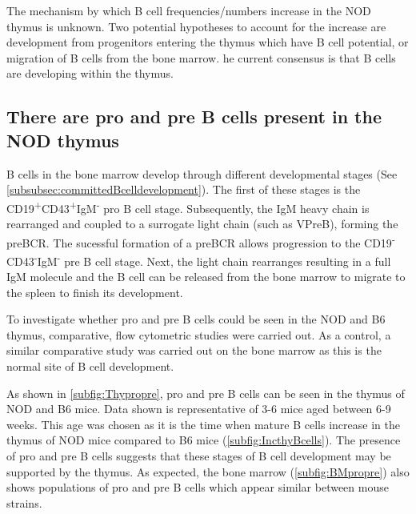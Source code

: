 The mechanism by which B cell frequencies/numbers increase in the NOD thymus is unknown. 
Two potential hypotheses to account for the increase are development from progenitors entering the thymus which have B cell potential, or migration of B cells from the bone marrow. \toref{}
he current consensus is that B cells are developing within the thymus. 


\subsection{There are pro and pre B cells present in the NOD thymus}
\label{subsec:proandpre}


B cells in the bone marrow develop through different developmental stages (See \cref{subsubsec:committedBcelldevelopment}).
The first of these stages is the CD19\textsuperscript{+}CD43\textsuperscript{+}IgM\textsuperscript{-} pro B cell stage.
Subsequently, the IgM heavy chain is rearranged and coupled to a surrogate light chain (such as VPreB), forming the preBCR. 
The sucessful formation of a preBCR allows progression to the CD19\textsuperscript{-}CD43\textsuperscript{-}IgM\textsuperscript{-} pre B cell stage.
Next, the light chain rearranges resulting in a full IgM molecule and the B cell can be released from the bone marrow to migrate to the spleen to finish its development.



To investigate whether pro and pre B cells could be seen in the NOD and B6 thymus, comparative, flow cytometric studies were carried out.
As a control, a similar comparative study was carried out on the bone marrow as this is the normal site of B cell development.

As shown in \cref{subfig:Thypropre}, pro and pre B cells can be seen in the thymus of NOD and B6 mice.
Data shown is representative of 3-6 mice aged between 6-9 weeks. %
This age was chosen as it is the time when mature B cells increase in the thymus of NOD mice compared to B6 mice (\cref{subfig:IncthyBcells}).
The presence of pro and pre B cells suggests that these stages of B cell development may be supported by the thymus. 
As expected, the bone marrow (\cref{subfig:BMpropre}) also shows populations of pro and pre B cells which appear similar between mouse strains.


